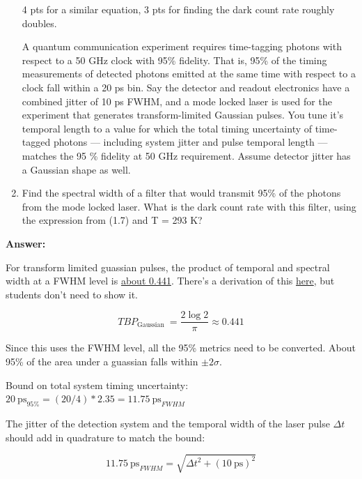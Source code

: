 \documentclass[12pt]{caltech_thesis}
\begin{document}
\begin{enumerate}
  {\color{darkred} 4 pts for a similar equation, 3 pts for finding the
  dark count rate roughly doubles. }

  A quantum communication experiment requires time-tagging photons with
  respect to a 50 GHz clock with 95\% fidelity. That is, 95\% of the
  timing measurements of detected photons emitted at the same time with
  respect to a clock fall within a 20 ps bin. Say the detector and
  readout electronics have a combined jitter of 10 ps FWHM, and a mode
  locked laser is used for the experiment that generates
  transform-limited Gaussian pulses. You tune it's temporal length to a
  value for which the total timing uncertainty of time-tagged photons
  --- including system jitter and pulse temporal length --- matches the
  95 \% fidelity at 50 GHz requirement. Assume detector jitter has a
  Gaussian shape as well.
\item
  Find the spectral width of a filter that would transmit 95\% of the
  photons from the mode locked laser. What is the dark count rate with
  this filter, using the expression from (1.7) and T = 293 K?
\end{enumerate}

{\color{midnightblue}  \textbf{Answer:} }

{\color{midnightblue} For transform limited guassian pulses, the product
of temporal and spectral width at a FWHM level is
\href{https://www.lasercalculator.com/transform-limited-pulse-calculator/}{about
0.441}. There's a derivation of this
\href{https://www.physicsforums.com/threads/time-bandwidth-product-ideal-mode-locking.171404/post-1339948}{here},
but students don't need to show it. }

{\color{midnightblue} 

\[T B P_{\text {Gaussian }}=\frac{2 \log 2}{\pi} \approx 0.441\]

}

{\color{midnightblue}  Since this uses the FWHM level, all the 95\%
metrics need to be converted. About 95\% of the area under a guassian
falls within \(\pm 2 \sigma\). }

{\color{midnightblue}  Bound on total system timing uncertainty:
\(20~\text{ps}_{95\%} = (20/4)*2.35 = 11.75~\text{ps}_{FWHM}\) }

{\color{midnightblue}  The jitter of the detection system and the
temporal width of the laser pulse \(\Delta t\) should add in quadrature
to match the bound: }

{\color{midnightblue} 

\[ 11.75~\text{ps}_{FWHM} = \sqrt{ \Delta t^2 + (10~\text{ps})^2}\]

}
\end{document}
